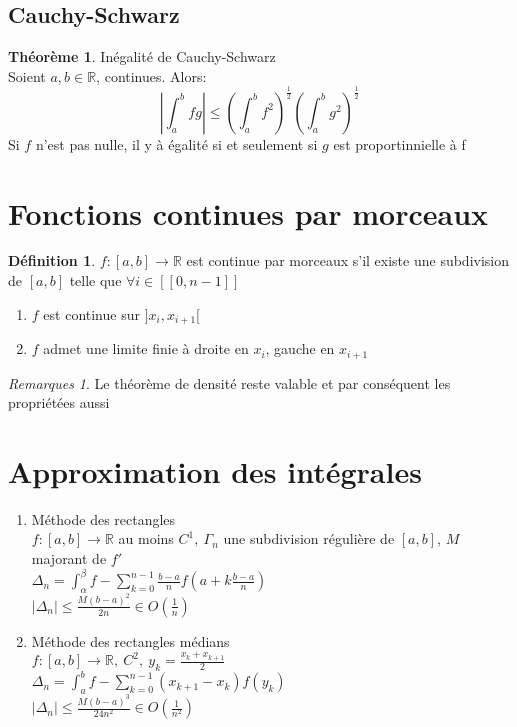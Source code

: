 \documentclass[fleqn]{article}
\theoremstyle{definition} \newtheorem*{defi}{D\'efinition}
\theoremstyle{definition} \newtheorem*{theo}{Th\'eor\`eme}
\theoremstyle{definition} \newtheorem*{coro}{Corollaire}
\theoremstyle{remark} \newtheorem*{rqs}{Remarques}
\theoremstyle{definition} \newtheorem*{prop}{Propri\'et\'e}
\begin{document}
\subsection{Cauchy-Schwarz}
\begin{theo} In\'egalit\'e de Cauchy-Schwarz \\
	Soient $a,b \in \mathbb{R}$, continues. Alors:
	\[\left|\int_a^b fg\right| \leq \left(\int_a^b f^2\right)^\frac{1}{2} \left(\int_a^b g^2\right)^\frac{1}{2}\]
	Si $f$ n'est pas nulle, il y \`a \'egalit\'e si et seulement si $g$ est proportinnielle \`a f
\end{theo}

\section{Fonctions continues par morceaux}
\begin{defi}
	$f:[a,b] \rightarrow \mathbb{R}$ est continue par morceaux s'il existe une subdivision de $[a,b]$ telle que $\forall i \in [\![0,n-1]\!]$
	\begin{enumerate}
		\item $f$ est continue sur $]x_i, x_{i+1}[$
		\item $f$ admet une limite finie \`a droite en $x_i$, gauche en $x_{i+1}$
	\end{enumerate}
\end{defi}

\begin{rqs}
	Le th\'eor\`eme de densit\'e reste valable et par cons\'equent les propri\'et\'ees aussi
\end{rqs}

\section{Approximation des int\'egrales}
\begin{enumerate}
	\item M\'ethode des rectangles \\
		$f:[a,b] \rightarrow \mathbb{R}$ au moins $C^1,\ \Gamma_n$ une subdivision r\'eguli\`ere de $[a,b]$, $M$ majorant de $f'$ \\
		$\Delta_n = \int_\alpha^\beta f - \sum_{k=0}^{n-1} \frac{b-a}{n} f(a + k\frac{b-a}{n})$ \\
		$|\Delta_n| \leq \frac{M(b-a)^2}{2n} \in O(\frac{1}{n})$
	\item M\'ethode des rectangles m\'edians \\
		$f:[a,b] \rightarrow \mathbb{R},\ C^2,\ y_k = \frac{x_k + x_{k+1}}{2}$ \\
		$\Delta_n = \int_a^b f - \sum_{k=0}^{n-1} (x_{k+1} - x_k)f(y_k)$ \\
		$|\Delta_n| \leq \frac{M(b-a)^3}{24n^2} \in O(\frac{1}{n^2})$

\end{enumerate}
\end{document}
